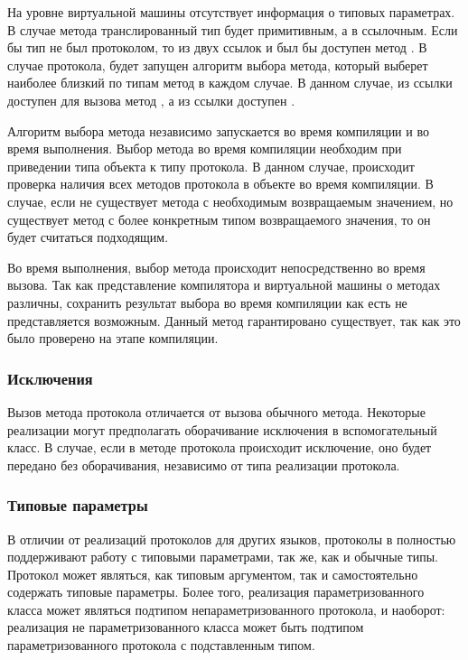 На уровне виртуальной машины отсутствует информация о типовых параметрах. В случае метода  транслированный тип будет примитивным, а в  ссылочным. Если бы тип  не был протоколом, то из двух ссылок  и  был бы доступен метод . В случае протокола, будет запущен алгоритм выбора метода, который выберет наиболее близкий по типам метод в каждом случае. В данном случае, из ссылки  доступен для вызова метод , а из ссылки  доступен .

Алгоритм выбора метода независимо запускается во время компиляции и во время выполнения. Выбор метода во время компиляции необходим при приведении типа объекта к типу протокола. В данном случае, происходит проверка наличия всех методов протокола в объекте во время компиляции. В случае, если не существует метода с необходимым возвращаемым значением, но существует метод с более конкретным типом возвращаемого значения, то он будет считаться подходящим.

Во время выполнения, выбор метода происходит непосредственно во время вызова. Так как представление компилятора и виртуальной машины о методах различны, сохранить результат выбора во время компиляции как есть не представляется возможным. Данный метод гарантировано существует, так как это было проверено на этапе компиляции.

\subsubsection{Исключения}
Вызов метода протокола отличается от вызова обычного метода. Некоторые реализации могут предполагать оборачивание исключения в вспомогательный класс. В случае, если в методе протокола происходит исключение, оно будет передано без оборачивания, независимо от типа реализации протокола.

\subsubsection{Типовые параметры}
В отличии от реализаций протоколов для других  языков, протоколы в  полностью поддерживают работу с типовыми параметрами, так же, как и обычные типы. Протокол может являться, как типовым аргументом, так и самостоятельно содержать типовые параметры. Более того, реализация параметризованного класса может являться подтипом непараметризованного протокола, и наоборот: реализация не параметризованного класса может быть подтипом параметризованного протокола с подставленным типом.

